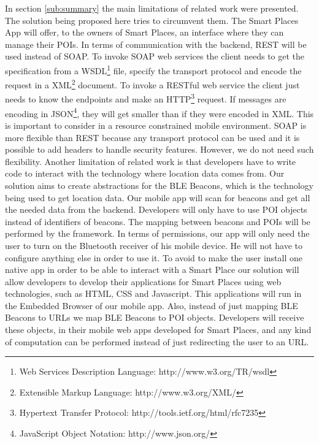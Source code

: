 In section \ref{sub:summary} the main limitations 
of related work were presented.
The solution being proposed here tries to
circumvent them. The Smart Places App will
offer, to the owners of Smart Places, an interface
where they can manage their POIs.
In terms of communication with the backend,
REST\cite{richardson2008restful} will be used instead
of SOAP. To invoke SOAP web services the client needs
to get the specification from a 
WSDL\footnote{Web Services Description Language:
http://www.w3.org/TR/wsdl} file, specify the
transport protocol and encode the request in a
XML\footnote{Extensible Markup Language:
http://www.w3.org/XML/} document. To invoke a
RESTful web service the client just needs to know
the endpoints and make an 
HTTP\footnote{Hypertext Transfer Protocol:
http://tools.ietf.org/html/rfc7235} request.
If messages are encoding in 
JSON\footnote{JavaScript Object Notation:
http://www.json.org/}, they will
get smaller than if they were encoded in XML.
This is important to consider in a resource constrained
mobile environment. SOAP is more flexible than REST
because any transport protocol can be used and it is
possible to add headers to handle security features.
However, we do not need such flexibility.
Another limitation of related work is that developers
have to write code to interact with the technology
where location data comes from. Our solution aims to
create abstractions for the BLE Beacons, which is the
technology being used to get location data.
Our mobile app will scan for beacons and get all the
needed data from the backend. Developers will only have
to use POI objects instead of identifiers of beacons.
The mapping between beacons and POIs will be performed
by the framework.
In terms of permissions, our app will only need the
user to turn on the Bluetooth receiver of his
mobile device. He will not have to configure
anything else in order to use it.
To avoid to make the user install one native app
in order to be able to interact with a Smart Place
our solution will allow developers to develop their
applications for Smart Places using web technologies,
such as HTML, CSS and Javascript. This applications
will run in the Embedded Browser of our mobile app.
Also, instead of just mapping BLE Beacons to URLs we map
BLE Beacons to POI objects. Developers will receive
these objects, in their mobile web apps developed for
Smart Places, and any kind of computation can be 
performed instead of just redirecting the user to an
URL.
